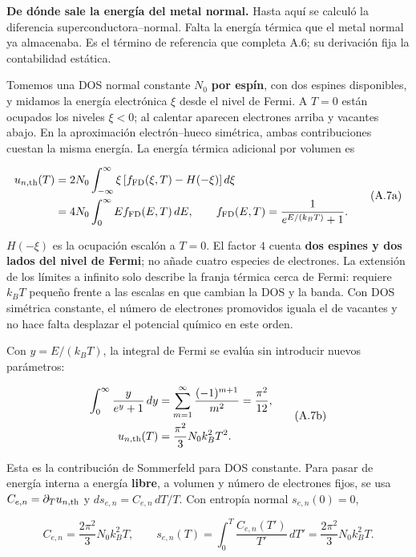 \documentclass[
  spanish,
  10pt,
  a4paper,
]{article}
\begin{document}
\textbf{De dónde sale la energía del metal normal.} Hasta aquí se
calculó la diferencia superconductora--normal. Falta la energía térmica
que el metal normal ya almacenaba. Es el término de referencia que
completa A.6; su derivación fija la contabilidad estática.

Tomemos una DOS normal constante \(N_0\) \textbf{por espín}, con dos
espines disponibles, y midamos la energía electrónica \(\xi\) desde el
nivel de Fermi. A \(T=0\) están ocupados los niveles \(\xi<0\); al
calentar aparecen electrones arriba y vacantes abajo. En la aproximación
electrón--hueco simétrica, ambas contribuciones cuestan la misma
energía. La energía térmica adicional por volumen es

\[
\begin{aligned}
u_{n,\rm th}(T)
&=2N_0\int_{-\infty}^{\infty}
\xi\,[f_{\rm FD}(\xi,T)-H(-\xi)]\,d\xi\\
&=4N_0\int_0^\infty E f_{\rm FD}(E,T)\,dE,
\qquad f_{\rm FD}(E,T)=\frac{1}{e^{E/(k_BT)}+1}.
\end{aligned}
\tag{A.7a}
\]

\(H(-\xi)\) es la ocupación escalón a \(T=0\). El factor \(4\) cuenta
\textbf{dos espines y dos lados del nivel de Fermi}; no añade cuatro
especies de electrones. La extensión de los límites a infinito solo
describe la franja térmica cerca de Fermi: requiere \(k_BT\) pequeño
frente a las escalas en que cambian la DOS y la banda. Con DOS simétrica
constante, el número de electrones promovidos iguala el de vacantes y no
hace falta desplazar el potencial químico en este orden.

Con \(y=E/(k_BT)\), la integral de Fermi se evalúa sin introducir nuevos
parámetros:

\[
\begin{aligned}
\int_0^\infty\frac{y}{e^y+1}\,dy
&=\sum_{m=1}^{\infty}\frac{(-1)^{m+1}}{m^2}
=\frac{\pi^2}{12},\\
u_{n,\rm th}(T)&=\frac{\pi^2}{3}N_0k_B^2T^2.
\end{aligned}
\tag{A.7b}
\]

Esta es la contribución de Sommerfeld para DOS constante. Para pasar de
energía interna a energía \textbf{libre}, a volumen y número de
electrones fijos, se usa \(C_{e,n}=\partial_Tu_{n,\rm th}\) y
\(ds_{e,n}=C_{e,n}\,dT/T\). Con entropía normal \(s_{e,n}(0)=0\),

\[
C_{e,n}=\frac{2\pi^2}{3}N_0k_B^2T,
\qquad
s_{e,n}(T)=\int_0^T\frac{C_{e,n}(T')}{T'}\,dT'
=\frac{2\pi^2}{3}N_0k_B^2T.
\tag{A.7c}
\]
\end{document}
